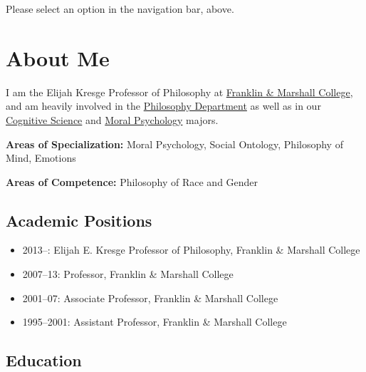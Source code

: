 \documentclass[%
  11pt,%
]{article}
\begin{document}

\tableofcontents

\ifdefined\HCode

  Please select an option in the navigation bar, above.
\else
\fi

\section{About Me}

I am the Elijah Kresge Professor of Philosophy at \href{www.fandm.edu}{Franklin \& Marshall College}, and am heavily involved in the \href{https://www.fandm.edu/fields-of-study/philosophy/index.html}{Philosophy Department} as well as in our \href{https://www.fandm.edu/fields-of-study/cognitive-science/index.html}{Cognitive Science} and \href{https://www.fandm.edu/fields-of-study/moral-psychology/index.html}{Moral Psychology} majors.

\noindent\textbf{Areas of Specialization:} Moral Psychology, Social Ontology, Philosophy of Mind, Emotions

\noindent\textbf{Areas of Competence:} Philosophy of Race and Gender

\subsection{Academic Positions}

\begin{itemize}
  \item 2013--: Elijah E. Kresge Professor of Philosophy, Franklin \& Marshall College
  \item 2007--13: Professor, Franklin \& Marshall College
  \item 2001--07: Associate Professor, Franklin \& Marshall College
  \item 1995--2001: Assistant Professor, Franklin \& Marshall College
\end{itemize}

\subsection{Education}
\end{document}
